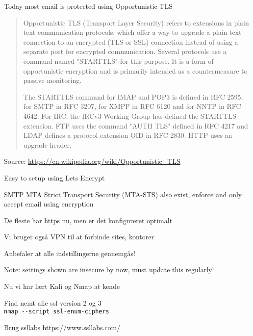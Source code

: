 \documentclass[Screen16to9,17pt]{foils}
\begin{document}


Today most email is protected using Opportunistic TLS
\begin{quote}\small
Opportunistic TLS (Transport Layer Security) refers to extensions in plain text communication protocols, which offer a way to upgrade a plain text connection to an encrypted (TLS or SSL) connection instead of using a separate port for encrypted communication. Several protocols use a command named "STARTTLS" for this purpose. It is a form of opportunistic encryption and is primarily intended as a countermeasure to passive monitoring.

The STARTTLS command for IMAP and POP3 is defined in RFC 2595, for SMTP in RFC 3207, for XMPP in RFC 6120 and for NNTP in RFC 4642. For IRC, the IRCv3 Working Group has defined the STARTTLS extension. FTP uses the command "AUTH TLS" defined in RFC 4217 and LDAP defines a protocol extension OID in RFC 2830. HTTP uses an upgrade header.
\end{quote}
Source: \url{https://en.wikipedia.org/wiki/Opportunistic_TLS}

\begin{list2}
\item Easy to setup using Lets Encrypt
\item SMTP MTA Strict Transport Security (MTA-STS) also exist, enforce and only accept email using encryption
\end{list2}




\begin{list2}
\item De fleste har https nu, men er det konfigureret optimalt
\item Vi bruger også VPN til at forbinde sites, kontorer
\item Anbefaler at alle indstillingerne gennemgås!
\item Note: settings shown are insecure by now, must update this regularly!
\end{list2}



\begin{list1}
\item Nu vi har lært Kali og Nmap at kende
\begin{list2}
\item Find nemt alle ssl version 2 og 3\\
\verb+nmap --script ssl-enum-ciphers+
\item Brug ssllabs https://www.ssllabs.com/
\end{list2}
\end{list1}
\end{document}
